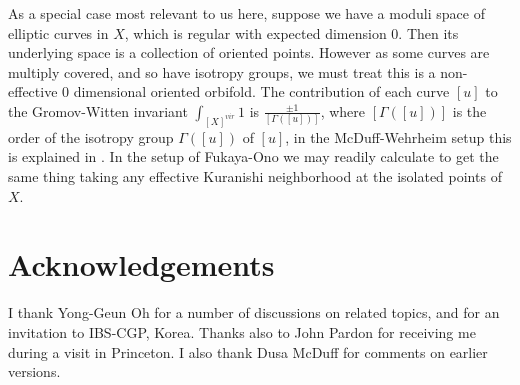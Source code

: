 \documentclass{amsart}
\numberwithin{equation}{section}
\theoremstyle{definition}
\theoremstyle{remark}
\begin{document}
\begin {appendices}
As a special case most relevant to us here, suppose we have a moduli space
of elliptic curves in  $X$, which is regular with
expected dimension 0. Then its underlying space is a collection of oriented points.
However as some curves are multiply covered, and so have isotropy
groups,  we must treat this is a non-effective 0 dimensional oriented orbifold.
The contribution of each curve $[u]$ to the Gromov-Witten invariant $\int
_{[X] ^{vir} } 1 $ is $\frac{\pm 1}{[\Gamma ([u])]}$, where $[\Gamma ([u])]$ is
the order of the isotropy group $\Gamma ([u])$ of $[u]$, 
in the McDuff-Wehrheim setup this is explained in \cite[Section
5]{citeMcDuffNotesOnKuranishi}. In the setup of Fukaya-Ono
  \cite{citeFukayaOnoArnoldandGW} we may readily calculate to get the same thing
  taking any effective Kuranishi neighborhood
at the isolated points of $X$. 
\end{appendices}
\section{Acknowledgements} 
I thank Yong-Geun Oh for a number of discussions on related topics, and for an invitation to IBS-CGP, Korea. Thanks also to John Pardon for receiving me during a visit in Princeton. I also thank Dusa McDuff for comments on earlier versions.
  
%    
 
\end{document}
